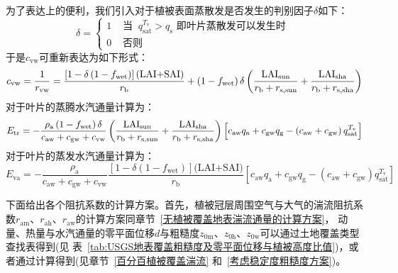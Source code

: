 为了表达上的便利，我们引入对于植被表面蒸散发是否发生的判别因子$\delta$如下：
\begin{equation}
  \label{delta_cal}
  \delta=
  \begin{cases}
    1 & \text { 当 }\ q_{\mathrm{s a t}}^{T_{\mathrm{v}}}>q_{\mathrm{s}} \text { 即叶片蒸散发可以发生时 } \\
    0 & \text { 否则 }
  \end{cases}
\end{equation}
于是$c_{\mathrm{vw}}$可重新表达为如下形式：
\begin{equation}
  c_{\mathrm{vw}}=\frac{1}{r_{\mathrm{vw}}}=\frac{\left[1-\delta\left(1-f_{\mathrm{wet}}\right)\right](\text{LAI+SAI})}{r_{\mathrm{b}}}+\left( 1 - f_{\mathrm{wet}} \right)\delta\left( \frac{\rm LAI_{\mathrm{sun}}}{r_{\mathrm{b}} + r_{\mathrm{s,\rm sun}}} + \frac{\rm LAI_{\mathrm{sha}}}{r_{\mathrm{b}} + r_{\mathrm{s,\rm sha}}} \right)
\end{equation}
对于叶片的蒸腾水汽通量计算为：
\begin{equation}
  E_{\mathrm{tr}} = -\frac{\rho_{\mathrm{a}}\left(1-f_{\mathrm{w e t}}\right)\delta }{c_{\mathrm{aw}}+c_{\mathrm{gw}}+c_{\mathrm{vw}}}\left( \frac{\rm LAI_{\mathrm{sun}}}{r_{\mathrm{b}} + r_{\mathrm{s,\rm sun}}} + \frac{\rm LAI_{\mathrm{sha}}}{r_{\mathrm{b}} + r_{\mathrm{s,\rm sha}}} \right) \left[c_{\mathrm{aw}} q_{\mathrm{a}}+c_{\mathrm{gw}} q_{\mathrm{g}}-\left(c_{\mathrm{aw}}+c_{\mathrm{gw}}\right) q_{\mathrm{s a t}}^{T_{\mathrm{v}}}\right]
\end{equation}
对于叶片的蒸发水汽通量计算为：
\begin{equation}
  E_{\mathrm{va}} = -\frac{\rho_{\mathrm{a}}}{c_{\mathrm{aw}}+c_{\mathrm{gw}}+c_{\mathrm{vw}}} \frac{\left[1-\delta\left(1-f_{\mathrm{w e t}}\right)\right](\text {LAI+SAI)}}{r_{\mathrm{b}}}\left[c_{\mathrm{aw}} q_{\mathrm{a}}+c_{\mathrm{gw}} q_{\mathrm{g}}-\left(c_{\mathrm{aw}}+c_{\mathrm{gw}}\right) q_{\mathrm{sat}}^{T_{\mathrm{v}}}\right]
\end{equation}

下面给出各个阻抗系数的计算方案。首先，植被冠层周围空气与大气的湍流阻抗系数$r_{\mathrm{am}}$、$r_{\mathrm{ah}}$、$r_{\mathrm{aw}}$的计算方案同章节~\ref{无植被覆盖地表湍流通量的计算方案}，
动量、热量与水汽通量的零平面位移$d$与粗糙度$z_{\mathrm{0m}}$、$z_{\mathrm{0h}}$、$z_{\mathrm{0w}}$可以通过土地覆盖类型查找表得到(见
表~\ref{tab:USGS地表覆盖粗糙度及零平面位移与植被高度比值})，或者通过计算得到(见章节~\ref{百分百植被覆盖湍流} 和~\ref{考虑稳定度粗糙度方案})。

